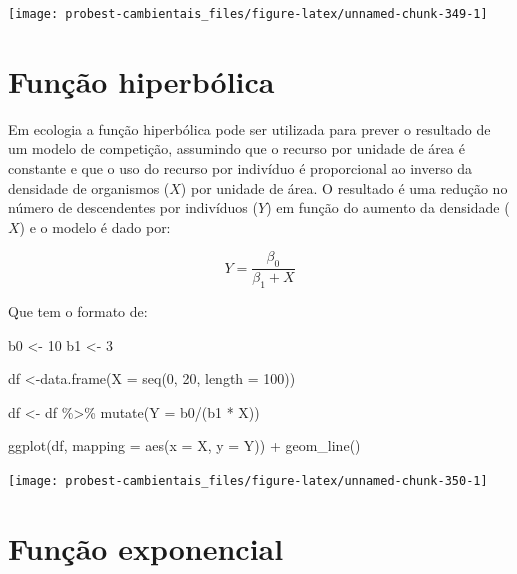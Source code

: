 \documentclass[
]{book}
\newenvironment{Shaded}{\begin{snugshade}}{\end{snugshade}}
\newcommand{\AttributeTok}[1]{\textcolor[rgb]{0.77,0.63,0.00}{#1}}
\newcommand{\DecValTok}[1]{\textcolor[rgb]{0.00,0.00,0.81}{#1}}
\newcommand{\FunctionTok}[1]{\textcolor[rgb]{0.00,0.00,0.00}{#1}}
\newcommand{\NormalTok}[1]{#1}
\newcommand{\OtherTok}[1]{\textcolor[rgb]{0.56,0.35,0.01}{#1}}
\newcommand{\SpecialCharTok}[1]{\textcolor[rgb]{0.00,0.00,0.00}{#1}}
\begin{document}
\begin{center}\texttt{[image: probest-cambientais\_files/figure-latex/unnamed-chunk-349-1]} \end{center}

\hypertarget{funuxe7uxe3o-hiperbuxf3lica}{%
\section{Função hiperbólica}\label{funuxe7uxe3o-hiperbuxf3lica}}

Em ecologia a função hiperbólica pode ser utilizada para prever o resultado de um modelo de competição, assumindo que o recurso por unidade de área é constante e que o uso do recurso por indivíduo é proporcional ao inverso da densidade de organismos (\(X\)) por unidade de área. O resultado é uma redução no número de descendentes por indivíduos (\(Y\)) em função do aumento da densidade (\(X\)) e o modelo é dado por:

\[ Y = \frac{\beta_0}{\beta_1 + X}\]

Que tem o formato de:

\begin{Shaded}
\begin{Highlighting}[]
\NormalTok{b0 }\OtherTok{\textless{}{-}} \DecValTok{10}
\NormalTok{b1 }\OtherTok{\textless{}{-}} \DecValTok{3}

\NormalTok{df }\OtherTok{\textless{}{-}}\FunctionTok{data.frame}\NormalTok{(}\AttributeTok{X =} \FunctionTok{seq}\NormalTok{(}\DecValTok{0}\NormalTok{, }\DecValTok{20}\NormalTok{, }\AttributeTok{length =} \DecValTok{100}\NormalTok{))}

\NormalTok{df }\OtherTok{\textless{}{-}}\NormalTok{ df }\SpecialCharTok{\%\textgreater{}\%} \FunctionTok{mutate}\NormalTok{(}\AttributeTok{Y =}\NormalTok{ b0}\SpecialCharTok{/}\NormalTok{(b1 }\SpecialCharTok{*}\NormalTok{ X))}

\FunctionTok{ggplot}\NormalTok{(df, }\AttributeTok{mapping =} \FunctionTok{aes}\NormalTok{(}\AttributeTok{x =}\NormalTok{ X, }\AttributeTok{y =}\NormalTok{ Y)) }\SpecialCharTok{+}
  \FunctionTok{geom\_line}\NormalTok{()}
\end{Highlighting}
\end{Shaded}

\begin{center}\texttt{[image: probest-cambientais\_files/figure-latex/unnamed-chunk-350-1]} \end{center}

\hypertarget{funuxe7uxe3o-exponencial}{%
\section{Função exponencial}\label{funuxe7uxe3o-exponencial}}
\end{document}
